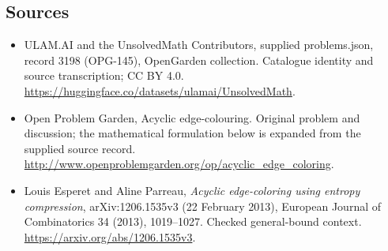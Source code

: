 \documentclass[11pt,a4paper]{article}
\begin{document}
\subsection{Sources}
\begin{itemize}
\item[S1] ULAM.AI and the UnsolvedMath Contributors, supplied problems.json, record 3198 (OPG-145), OpenGarden collection. Catalogue identity and source transcription; CC BY 4.0.
\url{https://huggingface.co/datasets/ulamai/UnsolvedMath}.
\item[S2] Open Problem Garden, Acyclic edge-colouring. Original problem and discussion; the mathematical formulation below is expanded from the supplied source record.
\url{http://www.openproblemgarden.org/op/acyclic_edge_coloring}.
\item[S3] Louis Esperet and Aline Parreau, \emph{Acyclic edge-coloring using entropy compression}, arXiv:1206.1535v3 (22 February 2013), European Journal of Combinatorics 34 (2013), 1019--1027. Checked general-bound context.
\url{https://arxiv.org/abs/1206.1535v3}.
\end{itemize}
\end{document}
